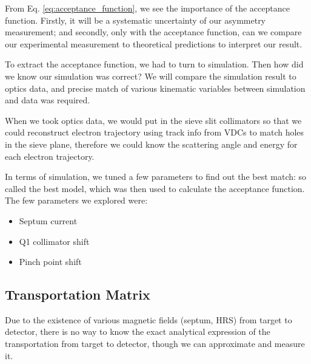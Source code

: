 From Eq. \ref{eq:acceptance_function}, we see the importance of the acceptance
function. Firstly, it will be a systematic uncertainty of our asymmetry
measurement; and secondly, only with the acceptance function, can we compare
our experimental measurement to theoretical predictions to interpret our
result.

To extract the acceptance function, we had to turn to simulation. Then how
did we know our simulation was correct? We will compare the simulation result
to optics data, and precise match of various kinematic variables between simulation
and data was required. 

When we took optics data, we would put in the sieve slit collimators so that 
we could reconstruct electron trajectory using track info from VDCs 
to match holes in the sieve plane, therefore we could know the scattering angle and 
energy for each electron trajectory.

In terms of simulation, we tuned a few parameters to find out the best
match: so called the best model, which was then used to calculate the acceptance
function. The few parameters we explored were:
\begin{itemize}
    \item Septum current
    \item Q1 collimator shift
    \item Pinch point shift
\end{itemize}

\subsection{Transportation Matrix}
Due to the existence of various magnetic fields (septum, HRS) from target to detector, 
there is no way to know the exact analytical expression of the transportation
from target to detector, though we can approximate and measure it.

